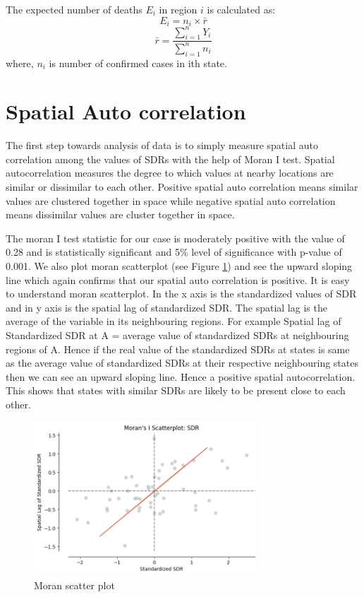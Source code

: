 \documentclass[enabledeprecatedfontcommands,parskip=half,twoside=semi,BCOR=0mm]{scrreprt}
\numberwithin{equation}{chapter}
\theoremstyle{definition}
\theoremstyle{remark}
\begin{document}
    The expected number of deaths \(E_i\) in region \(i\) is calculated as:
    \[
    E_i = n_i \times \bar{r}
    \]
    \[
    \bar{r} = \frac{\sum_{i=1}^{n} Y_i}{\sum_{i=1}^{n} n_i}
    \]
    where, \(n_i\) is number of confirmed cases in ith state.
    
    \section{Spatial Auto correlation}
    
    The first step towards analysis of data is to simply measure spatial auto correlation among the values of SDRs with the help of Moran I test. Spatial autocorrelation measures the degree to which values at nearby locations are similar or dissimilar to each other. Positive spatial auto correlation means similar values are clustered together in space while negative spatial auto correlation means dissimilar values are cluster together in space. 
    
    The moran I test statistic for our case is moderately positive with the value of 0.28 and is statistically significant and 5\% level of significance with p-value of 0.001. We also plot moran scatterplot (see Figure \ref{fig:Figure 1}) and see the upward sloping line which again confirms that our spatial auto correlation is positive. It is easy to understand moran scatterplot. In the x axis is the standardized values of SDR and in y axis is the spatial lag of standardized SDR. The spatial lag is the average of the variable in its neighbouring regions. For example Spatial lag of Standardized SDR at A = average value of standardized SDRs at neighbouring regions of A. Hence if the real value of the standardized SDRs at states is same as the average value of standardized SDRs at their respective neighbouring states then we can see an upward sloping line. Hence a positive spatial autocorrelation. This shows that states with similar SDRs are likely to be present close to each other.
    \begin{figure}[h]
    \centering
    \includegraphics[width=0.75\textwidth]{Moran_I.png}
    \caption{Moran scatter plot}
    \label{fig:Figure 1}
    \end{figure}
    
\end{document}
